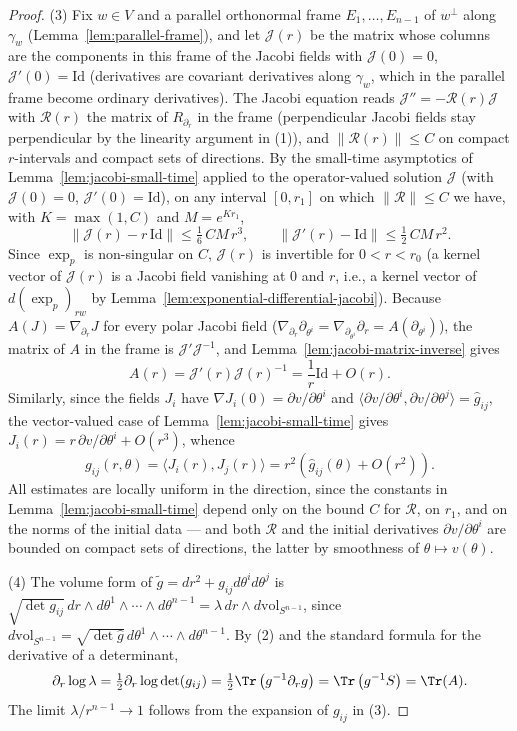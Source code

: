 \begin{proof}
(3) Fix $w\in V$ and a parallel orthonormal frame
$E_1,\ldots,E_{n-1}$ of $w^\perp$ along $\gamma_w$
(Lemma~\ref{lem:parallel-frame}), and let
${\mathcal J}(r)$ be the matrix whose columns are the components in
this frame of the Jacobi fields with ${\mathcal J}(0)=0$, ${\mathcal
J}'(0)=\mathrm{Id}$ (derivatives are covariant derivatives along
$\gamma_w$, which in the parallel frame become ordinary
derivatives). The Jacobi equation reads ${\mathcal
J}''=-{\mathcal R}(r){\mathcal J}$ with ${\mathcal R}(r)$ the matrix
of $R_{\partial_r}$ in the frame (perpendicular Jacobi fields stay
perpendicular by the linearity argument in (1)), and $\|{\mathcal
R}(r)\|\le C$ on compact $r$-intervals and compact sets of
directions. By the small-time asymptotics of
Lemma~\ref{lem:jacobi-small-time} applied to the operator-valued
solution ${\mathcal J}$ (with ${\mathcal J}(0)=0$,
${\mathcal J}'(0)=\mathrm{Id}$), on any interval $[0,r_1]$ on which
$\|{\mathcal R}\|\le C$ we have, with $K=\max(1,C)$ and
$M=e^{Kr_1}$,
$$\|{\mathcal J}(r)-r\,\mathrm{Id}\|\le\tfrac16\,CM\,r^3,\qquad
\|{\mathcal J}'(r)-\mathrm{Id}\|\le\tfrac12\,CM\,r^2.$$
Since $\exp_p$ is non-singular on
$C$, ${\mathcal J}(r)$ is invertible for $0<r<r_0$ (a kernel vector
of ${\mathcal J}(r)$ is a Jacobi field vanishing at $0$ and $r$,
i.e., a kernel vector of $d(\exp_p)_{rw}$ by
Lemma~\ref{lem:exponential-differential-jacobi}). Because
$A(J)=\nabla_{\partial_r}J$ for every polar Jacobi field
($\nabla_{\partial_r}\partial_{\theta^i}
=\nabla_{\partial_{\theta^i}}\partial_r=A(\partial_{\theta^i})$),
the matrix of $A$ in the frame is ${\mathcal J}'{\mathcal J}^{-1}$,
and Lemma~\ref{lem:jacobi-matrix-inverse} gives
$$A(r)={\mathcal J}'(r){\mathcal J}(r)^{-1}
=\frac{1}{r}\mathrm{Id}+O(r).$$
Similarly, since the fields $J_i$ have $\nabla J_i(0)=\partial
v/\partial\theta^i$ and $\langle \partial v/\partial\theta^i,
\partial v/\partial\theta^j\rangle=\hat g_{ij}$, the vector-valued
case of Lemma~\ref{lem:jacobi-small-time} gives
$J_i(r)=r\,\partial v/\partial\theta^i+O(r^3)$, whence
$$g_{ij}(r,\theta)=\langle J_i(r),J_j(r)\rangle
=r^2\left(\hat g_{ij}(\theta)+O(r^2)\right).$$
All estimates are locally uniform in the direction, since the
constants in Lemma~\ref{lem:jacobi-small-time} depend only on the
bound $C$ for ${\mathcal R}$, on $r_1$, and on the norms of the
initial data — and both ${\mathcal R}$ and the initial derivatives
$\partial v/\partial\theta^i$ are bounded on compact sets of
directions, the latter by smoothness of $\theta\mapsto v(\theta)$.

(4) The volume form of $\tilde g=dr^2+g_{ij}d\theta^id\theta^j$ is
$\sqrt{\det g_{ij}}\,dr\wedge d\theta^1\wedge\cdots\wedge
d\theta^{n-1}=\lambda\,dr\wedge d\mathrm{vol}_{S^{n-1}}$, since
$d\mathrm{vol}_{S^{n-1}}=\sqrt{\det\hat g}\,d\theta^1
\wedge\cdots\wedge d\theta^{n-1}$. By (2) and the standard formula
for the derivative of a determinant,
$$\partial_r\log\lambda=\tfrac12\partial_r\log\det(g_{ij})
=\tfrac12\Tr\left(g^{-1}\partial_rg\right)
=\Tr\left(g^{-1}S\right)=\Tr(A).$$
The limit $\lambda/r^{n-1}\to1$ follows from the expansion of
$g_{ij}$ in (3).
\end{proof}

